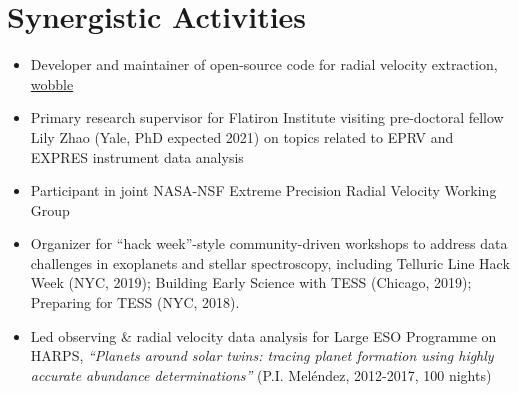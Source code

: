\documentclass[letter,12pt]{article} %
\begin{document}
\section{Synergistic Activities}

\begin{itemize}
\item Developer and maintainer of open-source code for radial velocity extraction, \href{https://www.github.com/megbedell/wobble}{wobble}

\item Primary research supervisor for Flatiron Institute visiting pre-doctoral fellow Lily Zhao (Yale, PhD expected 2021) on topics related to EPRV and EXPRES instrument data analysis

\item Participant in joint NASA-NSF Extreme Precision Radial Velocity Working Group

\item Organizer for ``hack week''-style community-driven workshops to address data challenges in exoplanets and stellar spectroscopy, including Telluric Line Hack Week (NYC, 2019); Building Early Science with TESS (Chicago, 2019); Preparing for TESS (NYC, 2018).

\item Led observing \& radial velocity data analysis for Large ESO Programme on HARPS, \textit{``Planets around solar twins: tracing planet formation using highly accurate abundance determinations''} (P.I. Mel\'{e}ndez, 2012-2017, 100 nights)

\end{itemize}
\end{document}
